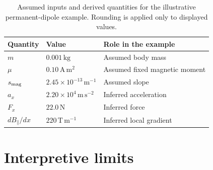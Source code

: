 \documentclass[12pt]{article}
\begin{document}
\begin{table}[ht]
  \centering
  \small
  \begin{tabular}{@{}lll@{}}
    \toprule
    Quantity & Value & Role in the example \\
    \midrule
    $m$ & $0.001\,\mathrm{kg}$ & Assumed body mass \\
    $\mu$ & $0.10\,\mathrm{A\,m^2}$ & Assumed fixed magnetic moment \\
    $s_{\rm mag}$ & $2.45\times10^{-13}\,\mathrm{m^{-1}}$ & Assumed slope \\
    $a_x$ & $2.20\times10^4\,\mathrm{m\,s^{-2}}$ & Inferred acceleration \\
    $F_x$ & $22.0\,\mathrm N$ & Inferred force \\
    $dB_{\parallel}/dx$ & $220\,\mathrm{T\,m^{-1}}$ & Inferred local gradient \\
    \bottomrule
  \end{tabular}
  \caption{Assumed inputs and derived quantities for the illustrative permanent-dipole example. Rounding is applied only to displayed values.}
  \label{tab:inverse-example}
\end{table}

\section{Interpretive limits}
\label{sec:limits}
\end{document}
